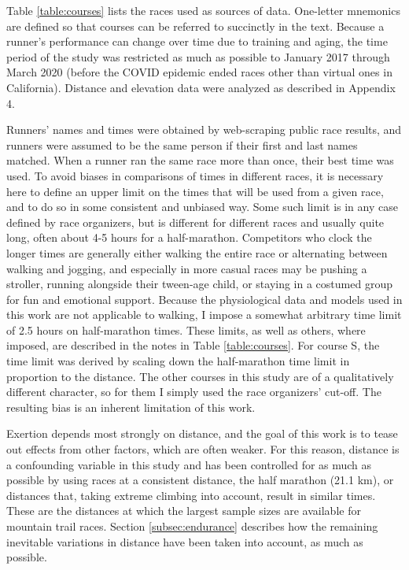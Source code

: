 \documentclass[10pt,letterpaper]{article}
\begin{document}
Table \ref{table:courses} lists the races used as sources of data.
One-letter mnemonics are defined so that courses can be referred to succinctly in the text.
Because a runner's performance can change over time due to training and aging,
the time period of the study was restricted as much as possible to January 2017 through March 2020
(before the COVID epidemic ended races other than virtual ones in California).
Distance and elevation data were analyzed as described in Appendix 4.

Runners' names and times were obtained by web-scraping public race results,
and runners were assumed to be the same person if their first and last names matched.
When a runner ran the same race more than once, their best time was used.
To avoid biases in comparisons of times in different races, it is necessary here to define
an upper limit on the times that will be used from a given race, and to do so in some
consistent and unbiased way. Some such limit is in any case
defined by race organizers, but is different for different races and usually quite long,
often about 4-5 hours for a half-marathon. Competitors who clock the longer times are generally
either walking the entire race or alternating between walking and jogging, and especially in
more casual races may be pushing a stroller, running alongside their tween-age child, or staying
in a costumed group for fun and emotional support. Because the physiological data and models
used in this work are not applicable to walking, I impose a somewhat arbitrary time limit of 2.5 hours
on half-marathon times. These limits, as well as others, where imposed,
are described in the notes in Table \ref{table:courses}. For course S, the time limit was derived by
scaling down the half-marathon time limit in proportion to the distance.
The other courses in this study are of a qualitatively different character, so for them I simply
used the race organizers' cut-off. The resulting bias is an inherent limitation of this work.

Exertion depends most strongly on distance, and the goal of this work is to tease out effects
from other factors, which are often weaker. For this reason, distance is a confounding variable
in this study and has been controlled for as much as possible by using races at a consistent
distance, the half marathon (21.1 km), or distances that, taking extreme climbing into account,
result in similar times. These are the distances at which the largest sample sizes are available for
mountain trail races. Section \ref{subsec:endurance} describes how the remaining inevitable
variations in distance have been taken into account, as much as possible.
\end{document}
